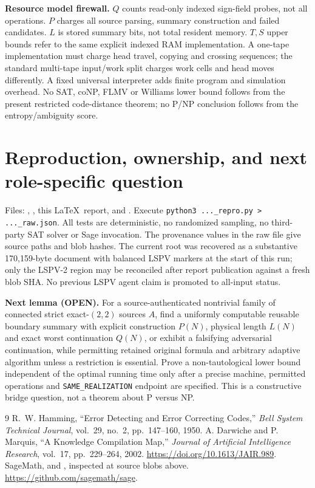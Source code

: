 \documentclass[10pt]{article}
\begin{document}
\noindent\textbf{Resource model firewall.} $Q$ counts read-only indexed sign-field probes, not all operations. $P$ charges all source parsing, summary construction and failed candidates. $L$ is stored summary bits, not total resident memory. $T,S$ upper bounds refer to the same explicit indexed RAM implementation. A one-tape implementation must charge head travel, copying and crossing sequences; the standard multi-tape input/work split charges work cells and head moves differently. A fixed universal interpreter adds finite program and simulation overhead. No SAT, coNP, FLMV or Williams lower bound follows from the present restricted code-distance theorem; no P/NP conclusion follows from the entropy/ambiguity score.

\section{Reproduction, ownership, and next role-specific question}
Files: , , this \LaTeX\ report, and . Execute \texttt{python3 ...\_repro.py > ...\_raw.json}. All tests are deterministic, no randomized sampling, no third-party SAT solver or Sage invocation. The provenance values in the raw file give source paths and blob hashes. The current root  was recovered as a substantive 170,159-byte document with balanced LSPV markers at the start of this run; only the LSPV-2 region may be reconciled after report publication against a fresh blob SHA. No previous LSPV agent claim is promoted to all-input status.

\noindent\textbf{Next lemma (OPEN).} For a source-authenticated nontrivial family of connected strict exact-$(2,2)$ sources $A$, find a uniformly computable reusable boundary summary with explicit construction $P(N)$, physical length $L(N)$ and exact worst continuation $Q(N)$, or exhibit a falsifying adversarial continuation, while permitting retained original formula and arbitrary adaptive algorithm unless a restriction is essential. Prove a non-tautological lower bound independent of the optimal running time only after a precise machine, permitted operations and \texttt{SAME\_REALIZATION} endpoint are specified. This is a constructive bridge question, not a theorem about P versus NP.
\begin{thebibliography}{9}
 R.~W. Hamming, ``Error Detecting and Error Correcting Codes,'' \emph{Bell System Technical Journal}, vol.~29, no.~2, pp.~147--160, 1950.
 A. Darwiche and P. Marquis, ``A Knowledge Compilation Map,'' \emph{Journal of Artificial Intelligence Research}, vol.~17, pp.~229--264, 2002. \url{https://doi.org/10.1613/JAIR.989}.
 SageMath,  and , inspected at source blobs above. \url{https://github.com/sagemath/sage}.
\end{thebibliography}
\end{document}
